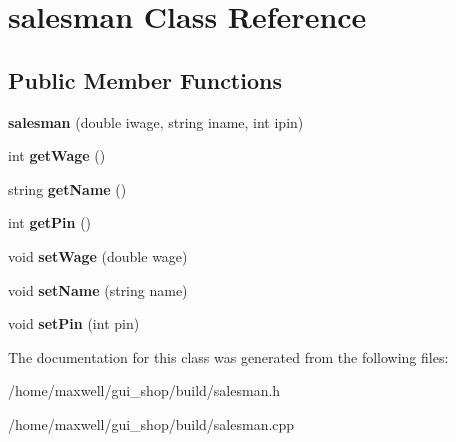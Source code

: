 \hypertarget{classsalesman}{}\section{salesman Class Reference}
\label{classsalesman}
\subsection*{Public Member Functions}
\begin{DoxyCompactItemize}
\item 
{\bfseries salesman} (double iwage, string iname, int ipin)\hypertarget{classsalesman_aae090e397885ba99363617d6e9f88e5b}{}\label{classsalesman_aae090e397885ba99363617d6e9f88e5b}

\item 
int {\bfseries get\+Wage} ()\hypertarget{classsalesman_a06e188c92535654b9641f48b298843ec}{}\label{classsalesman_a06e188c92535654b9641f48b298843ec}

\item 
string {\bfseries get\+Name} ()\hypertarget{classsalesman_a175554e3d78c71a635c00453817afdb8}{}\label{classsalesman_a175554e3d78c71a635c00453817afdb8}

\item 
int {\bfseries get\+Pin} ()\hypertarget{classsalesman_a5f8b1958d3f539125d7d2f42c400e055}{}\label{classsalesman_a5f8b1958d3f539125d7d2f42c400e055}

\item 
void {\bfseries set\+Wage} (double wage)\hypertarget{classsalesman_ad304b047a727b173664a2a4ba0c9428c}{}\label{classsalesman_ad304b047a727b173664a2a4ba0c9428c}

\item 
void {\bfseries set\+Name} (string name)\hypertarget{classsalesman_ae09fb675f86c168a6e7b09c948543c9c}{}\label{classsalesman_ae09fb675f86c168a6e7b09c948543c9c}

\item 
void {\bfseries set\+Pin} (int pin)\hypertarget{classsalesman_a5bc5c4df43197e26c0cc883352983191}{}\label{classsalesman_a5bc5c4df43197e26c0cc883352983191}

\end{DoxyCompactItemize}


The documentation for this class was generated from the following files\+:\begin{DoxyCompactItemize}
\item 
/home/maxwell/gui\+\_\+shop/build/salesman.\+h\item 
/home/maxwell/gui\+\_\+shop/build/salesman.\+cpp\end{DoxyCompactItemize}
